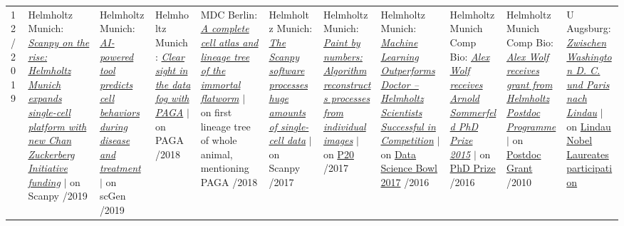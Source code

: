 \vspace{-.5em}
\begin{longtable}[t]{R{\widthC} p{\widthB}}
12/2019
&
Helmholtz Munich: \href{https://www.helmholtz-muenchen.de/en/aktuelles/latest-news/press-information-news/article/47037/index.html}{\textit{Scanpy on the rise: Helmholtz Munich expands single-cell platform with new Chan Zuckerberg Initiative funding}} {\footnotesize$\vert$ on Scanpy}
/2019
&
Helmholtz Munich: \href{https://www.helmholtz-muenchen.de/en/press-media/press-releases/all-press-releases/press-release/article/46553/}{\textit{AI-powered tool predicts cell behaviors during disease and treatment}}  {\footnotesize$\vert$ on scGen}
/2019
&
Helmholtz Munich: \href{https://www.helmholtz-muenchen.de/en/press-media/press-releases/all-press-releases/press-release/article/46175/}{\textit{Clear sight in the data fog with PAGA}}  {\footnotesize$\vert$ on PAGA}
/2018
& MDC Berlin: \href{https://www.mdc-berlin.de/news/press/complete-cell-atlas-and-lineage-tree-immortal-flatworm}{\textit{A complete cell atlas and lineage tree of the immortal flatworm}} {\footnotesize$\vert$ on first lineage tree of whole animal, mentioning PAGA}
/2018
& Helmholtz Munich: \href{https://www.helmholtz-muenchen.de/en/news/latest-news/press-information-news/article/44101/}{\textit{The Scanpy software processes huge amounts of single-cell data}} {\footnotesize$\vert$ on Scanpy} 
/2017
& Helmholtz Munich: \href{https://www.helmholtz-muenchen.de/en/news/latest-news/press-information-news/article/41458/}{\textit{Paint by numbers: Algorithm reconstructs processes from individual images}} {\footnotesize$\vert$ on \hyperlink{P20}{P20}}
/2017
& Helmholtz Munich: \href{https://www.helmholtz-muenchen.de/en/news/latest-news/press-information-news/article/40386/}{\textit{Machine Learning Outperforms Doctor – Helmholtz Scientists Successful in Competition}} {\footnotesize$\vert$ on \hyperlink{dsb3}{Data Science Bowl 2017}}
/2016
& Helmholtz Munich Comp Bio: \href{https://www.helmholtz-muenchen.de/icb/service/news/news/article/35113/index.html}{\textit{Alex Wolf receives Arnold Sommerfeld PhD Prize 2015}} {\footnotesize$\vert$ on \hyperlink{phdprize}{PhD Prize}} 
/2016
& Helmholtz Munich Comp Bio: \href{https://www.helmholtz-muenchen.de/icb/service/news/news/article/31360/index.html}{\textit{Alex Wolf receives grant from Helmholtz Postdoc Programme}} {\footnotesize$\vert$ on \hyperlink{hholtzpostdoc}{Postdoc Grant}}  
/2010
&
U Augsburg: 
\href{https://www.presse.uni-augsburg.de/unipressedienst/2010/april-juni/2010_134/}{\textit{Zwischen Washington D. C. und Paris nach Lindau}} {\footnotesize$\vert$ on \hyperlink{lindau}{Lindau Nobel Laureates participation}}
\end{longtable}



